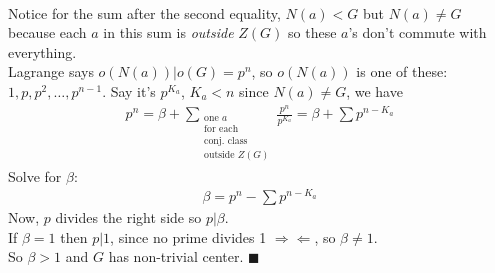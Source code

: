 \begin{theorem}
\begin{align}
\end{align}
Notice for the sum after the second equality, $N(a)<G$ but $N(a)\not = G$ because each $a$ in this sum is \textit{outside} $Z(G)$ so these $a$'s don't commute with everything. \steezybreak\\
Lagrange says $o(N(a))|o(G)=p^n$, so $o(N(a))$ is one of these: $1,p,p^2, \dots , p^{n-1}$. Say it's $p^{K_a}$, $K_a<n$ since $N(a)\not = G$, we have
\begin{align}
    p^n = \beta + \sum_{\substack{\text{one }a \\ \text{for each} \\ \text{conj. class} \\ \text{outside }Z(G)}} \frac{p^n}{p^{K_a}} = \beta + \sum p^{n-K_a}\nonumber
\end{align}
Solve for $\beta$:
\begin{align}
    \beta = p^n - \sum p^{n-K_a} \nonumber
\end{align}
Now, $p$ divides the right side so $p|\beta$. \steezybreak\\
If $\beta = 1$ then $p|1$, since no prime divides 1 $\Rightarrow\Leftarrow$, so $\beta \not = 1$. \\ So $\beta > 1$ and $G$ has non-trivial center. $\blacksquare$
\end{theorem}

